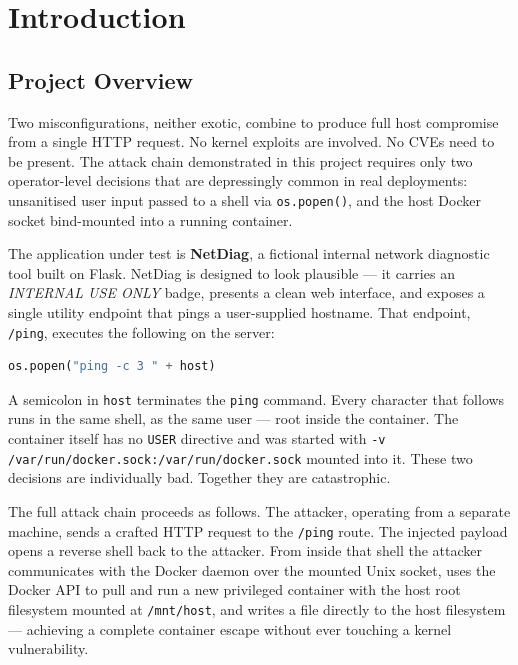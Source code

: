 
\chapter{Introduction}

\section{Project Overview}

Two misconfigurations, neither exotic, combine to produce full host compromise
from a single HTTP request. No kernel exploits are involved. No CVEs need to be
present. The attack chain demonstrated in this project requires only two
operator-level decisions that are depressingly common in real deployments:
unsanitised user input passed to a shell via \texttt{os.popen()}, and the host
Docker socket bind-mounted into a running container.

The application under test is \textbf{NetDiag}, a fictional internal network
diagnostic tool built on Flask. NetDiag is designed to look plausible --- it
carries an \textit{INTERNAL USE ONLY} badge, presents a clean web interface, and
exposes a single utility endpoint that pings a user-supplied hostname. That
endpoint, \texttt{/ping}, executes the following on the server:

\begin{lstlisting}[language=python]
os.popen("ping -c 3 " + host)
\end{lstlisting}

A semicolon in \texttt{host} terminates the \texttt{ping} command. Every
character that follows runs in the same shell, as the same user --- root inside
the container. The container itself has no \texttt{USER} directive and was
started with \texttt{-v /var/run/docker.sock:/var/run/docker.sock} mounted into
it. These two decisions are individually bad. Together they are catastrophic.

The full attack chain proceeds as follows. The attacker, operating from a
separate machine, sends a crafted HTTP request to the \texttt{/ping} route. The
injected payload opens a reverse shell back to the attacker. From inside that
shell the attacker communicates with the Docker daemon over the mounted Unix
socket, uses the Docker API to pull and run a new privileged container with the
host root filesystem mounted at \texttt{/mnt/host}, and writes a file directly
to the host filesystem --- achieving a complete container escape without ever
touching a kernel vulnerability.

